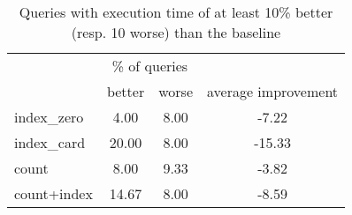 \documentclass[preview]{standalone}
\begin{document}
 
\begin{table}[!ht] 
\centering 
\begin{tabular}{lccc} 
& \multicolumn{2}{c}{\% of queries} \\\cline{2-3}& better & worse & average improvement \\ \hline 
index\_zero & 4.00 & 8.00 & -7.22 \\ 
 index\_card & 20.00 & 8.00 & -15.33 \\ 
 count & 8.00 & 9.33 & -3.82 \\ 
 count+index & 14.67 & 8.00 & -8.59 \\ 
 \end{tabular} 
\caption{Queries with execution time of at least 10\% better (resp. 10 worse) than the baseline}
\end{table} 
\end{document}
